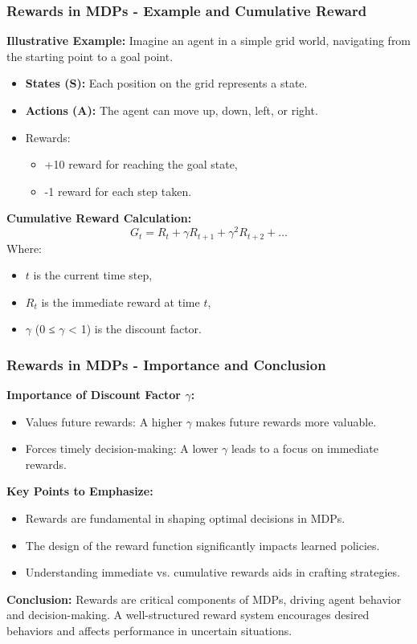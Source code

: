 \documentclass[aspectratio=169]{beamer}
\begin{document}
\begin{frame}[fragile]
    \frametitle{Rewards in MDPs - Example and Cumulative Reward}
    \textbf{Illustrative Example:}
    Imagine an agent in a simple grid world, navigating from the starting point to a goal point.
    \begin{itemize}
        \item \textbf{States (S):} Each position on the grid represents a state.
        \item \textbf{Actions (A):} The agent can move up, down, left, or right.
        \item Rewards: 
        \begin{itemize}
            \item +10 reward for reaching the goal state,
            \item -1 reward for each step taken.
        \end{itemize}
    \end{itemize}
    
    \textbf{Cumulative Reward Calculation:}
    \begin{equation}
    G_t = R_t + \gamma R_{t+1} + \gamma^2 R_{t+2} + \ldots
    \end{equation}
    Where:
    \begin{itemize}
        \item \( t \) is the current time step,
        \item \( R_t \) is the immediate reward at time \( t \),
        \item \( \gamma \) (0 ≤ \( \gamma \) < 1) is the discount factor.
    \end{itemize}
\end{frame}

\begin{frame}[fragile]
    \frametitle{Rewards in MDPs - Importance and Conclusion}
    \textbf{Importance of Discount Factor \( \gamma \):}
    \begin{itemize}
        \item Values future rewards: A higher \( \gamma \) makes future rewards more valuable.
        \item Forces timely decision-making: A lower \( \gamma \) leads to a focus on immediate rewards.
    \end{itemize}

    \textbf{Key Points to Emphasize:}
    \begin{itemize}
        \item Rewards are fundamental in shaping optimal decisions in MDPs.
        \item The design of the reward function significantly impacts learned policies.
        \item Understanding immediate vs. cumulative rewards aids in crafting strategies.
    \end{itemize}

    \textbf{Conclusion:}
    Rewards are critical components of MDPs, driving agent behavior and decision-making. A well-structured reward system encourages desired behaviors and affects performance in uncertain situations.
\end{frame}
\end{document}
